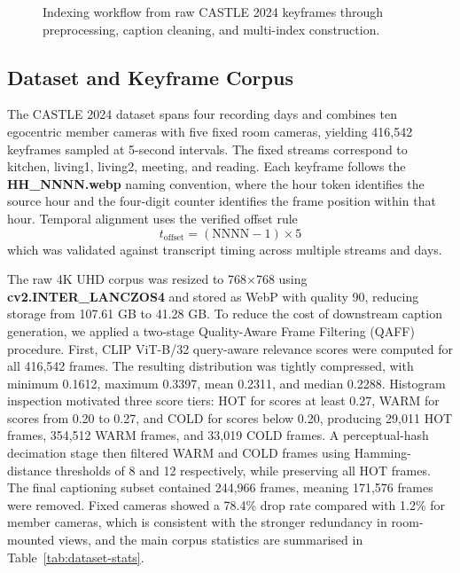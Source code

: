\begin{figure}[t]
{
  }
  \caption{Indexing workflow from raw CASTLE 2024 keyframes through preprocessing, caption cleaning, and multi-index construction.}
  \label{fig:indexing-flow}
\end{figure}

\subsection{Dataset and Keyframe Corpus}
\label{sec:dataset}

The CASTLE 2024 dataset spans four recording days and combines ten egocentric member cameras with five fixed room cameras, yielding 416,542 keyframes sampled at 5-second intervals. The fixed streams correspond to kitchen, living1, living2, meeting, and reading. Each keyframe follows the \textbf{HH\_NNNN.webp} naming convention, where the hour token identifies the source hour and the four-digit counter identifies the frame position within that hour. Temporal alignment uses the verified offset rule
\[
  t_{\text{offset}} = (\text{NNNN} - 1) \times 5
\]
which was validated against transcript timing across multiple streams and days.

The raw 4K UHD corpus was resized to 768$\times$768 using \textbf{cv2.INTER\_LANCZOS4} and stored as WebP with quality 90, reducing storage from 107.61 GB to 41.28 GB. To reduce the cost of downstream caption generation, we applied a two-stage Quality-Aware Frame Filtering (QAFF) procedure. First, CLIP ViT-B/32 query-aware relevance scores were computed for all 416,542 frames. The resulting distribution was tightly compressed, with minimum 0.1612, maximum 0.3397, mean 0.2311, and median 0.2288. Histogram inspection motivated three score tiers: HOT for scores at least 0.27, WARM for scores from 0.20 to 0.27, and COLD for scores below 0.20, producing 29,011 HOT frames, 354,512 WARM frames, and 33,019 COLD frames. A perceptual-hash decimation stage then filtered WARM and COLD frames using Hamming-distance thresholds of 8 and 12 respectively, while preserving all HOT frames. The final captioning subset contained 244,966 frames, meaning 171,576 frames were removed. Fixed cameras showed a 78.4\% drop rate compared with 1.2\% for member cameras, which is consistent with the stronger redundancy in room-mounted views, and the main corpus statistics are summarised in Table~\ref{tab:dataset-stats}.

